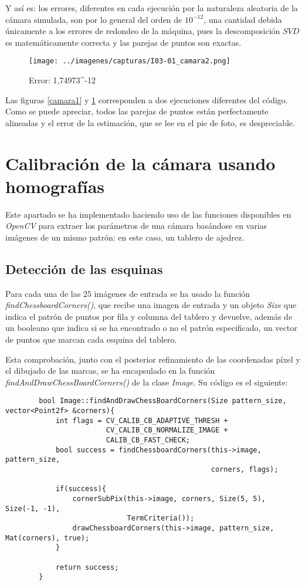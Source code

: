 \documentclass[a4paper, 11pt]{article}
\theoremstyle{definition}
\theoremstyle{theorem}
\begin{document}
    Y así es: los errores, diferentes en cada ejecución por la naturaleza aleatoria de la cámara simulada, son por lo general del orden de $10^{-12}$, una cantidad debida únicamente a los errores de redondeo de la máquina, pues la descomposición $SVD$ es matemáticamente correcta y las parejas de puntos son exactas.

    \begin{figure}[h!]
        \centering
        \texttt{[image: ../imagenes/capturas/I03-01\_camara2.png]}
        \caption{Error:  1,74973^{-12} \label{camara2}}
    \end{figure}

    Las figuras \ref{camara1} y \ref{camara2} corresponden a dos ejecuciones diferentes del código. Como se puede apreciar, todos las parejas de puntos están perfectamente alineadas y el error de la estimación, que se lee en el pie de foto, es despreciable.

    \newpage
    \section{Calibración de la cámara usando homografías}


    Este apartado se ha implementado haciendo uso de las funciones disponibles en \emph{OpenCV} para extraer los parámetros de una cámara basándose en varias imágenes de un mismo patrón: en este caso, un tablero de ajedrez.

    \subsection{Detección de las esquinas}
    Para cada una de las 25 imágenes de entrada se ha usado la función \emph{findChessboardCorners()}, que recibe una imagen de entrada y un objeto \emph{Size} que indica el patrón de puntos por fila y columna del tablero y devuelve, además de un booleano que indica si se ha encontrado o no el patrón especificado, un vector de puntos que marcan cada esquina del tablero.

    Esta comprobación, junto con el posterior refinamiento de las coordenadas píxel y el dibujado de las marcas, se ha encapsulado en la función \emph{findAndDrawChessBoardCorners()} de la clase \emph{Image}. Su código es el siguiente:

    \begin{lstlisting}
        bool Image::findAndDrawChessBoardCorners(Size pattern_size, vector<Point2f> &corners){
            int flags = CV_CALIB_CB_ADAPTIVE_THRESH +
                        CV_CALIB_CB_NORMALIZE_IMAGE +
                        CALIB_CB_FAST_CHECK;
            bool success = findChessboardCorners(this->image, pattern_size,
                                                 corners, flags);

            if(success){
                cornerSubPix(this->image, corners, Size(5, 5), Size(-1, -1),
                             TermCriteria());
                drawChessboardCorners(this->image, pattern_size, Mat(corners), true);
            }

            return success;
        }
    \end{lstlisting}
\end{document}
